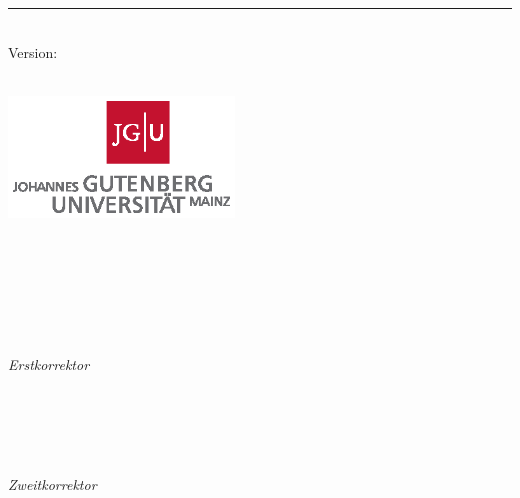 \begin{titlepage}
	\flushright
	\hfill
	\vfill
	{\LARGE\thesisTitle \par}
	{\color{ctcolortitle}\rule[5pt]{\textwidth}{1pt} \par}
	{\Large\thesisName}
	\vfill
	\textit{\large\thesisDate} \\
	Version: \thesisVersion
\end{titlepage}


\begin{titlepage}
	\tgherosfont
	\centering

	{\Large \thesisUniversity} \\[4mm]
	\includegraphics[width=6cm]{gfx/jgu_logo_quad.eps} \\[2mm]
	\textsf{\thesisUniversityDepartment} \\
	\textsf{\thesisUniversityInstitute} \\
	\textsf{\thesisUniversityGroup} \\

	\vfill
	{\large \thesisSubject} \\[5mm]
	{\LARGE \color{ctcolortitle}\textbf{\thesisTitle} \\[10mm]}
	{\Large \thesisName} \\

	\vfill
	\begin{minipage}[t]{.27\textwidth}
		\raggedleft
		\textit{Erstkorrektor}
	\end{minipage}
	\hspace*{15pt}
	\begin{minipage}[t]{.65\textwidth}
		{\Large \thesisReviewer} \\
	  	{\small \thesisReviewerDepartment} \\[-1mm]
		{\small \thesisReviewerUniversity}
	\end{minipage} \\[5mm]
	
	\begin{minipage}[t]{.27\textwidth}
		\raggedleft
		\textit{Zweitkorrektor}
	\end{minipage}
	\hspace*{15pt}
	\begin{minipage}[t]{.65\textwidth}
		{\Large \thesisSupervisor} \\
	    {\small \thesisSupervisorDepartment} \\[-1mm]
		{\small \thesisSupervisorUniversity}
	\end{minipage} \\[10mm]


\end{titlepage}
